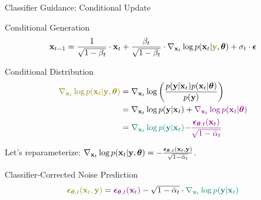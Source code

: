\documentclass{beamer}
\begin{document}
\begin{frame}{Classifier Guidance: Conditional Update}
	\begin{block}{Conditional Generation}
		\vspace{-0.5cm}
		\[
			\bx_{t - 1} = \frac{1}{\sqrt{1 - \beta_t}}\cdot \bx_t +  \frac{\beta_t}{\sqrt{1 - \beta_t}}  \cdot  \nabla_{\bx_t} \log p(\bx_t | {\color{olive}\by}, \btheta) +  \sigma_t \cdot \bepsilon
		\]
		\vspace{-0.5cm}
	\end{block}
	\begin{block}{Conditional Distribution}
		\vspace{-0.7cm}
		\begin{align*}
			{\color{olive}\nabla_{\bx_t} \log p(\bx_t | \by, \btheta)} &= \nabla_{\bx_t} \log \left(\frac{p(\by | \bx_t)p(\bx_t | \btheta)}{p(\by)} \right)\\
			&= \nabla_{\bx_t} \log p(\by | \bx_t) + {\color{violet}\nabla_{\bx_t} \log p(\bx_t | \btheta)}\\
			&= {\color{teal}\nabla_{\bx_t} \log p(\by | \bx_t)} {\color{violet}- \frac{\bepsilon_{\btheta, t}(\bx_t)}{\sqrt{1 - \bar{\alpha}_t}}}
		\end{align*}
		\vspace{-0.5cm}
	\end{block}
	Let's reparameterize: $\nabla_{\mathbf{x}_t} \log p(\mathbf{x}_t | \mathbf{y}, \boldsymbol{\theta}) = - \frac{\boldsymbol{\epsilon}_{\boldsymbol{\theta}, t}(\mathbf{x}_t, \mathbf{y})}{\sqrt{1 - \bar{\alpha}_t}}$.
	\begin{block}{Classifier-Corrected Noise Prediction}
		\vspace{-0.3cm}
		\[
			{\color{olive}\bepsilon_{\btheta, t}(\bx_t, \by)} = {\color{violet}\bepsilon_{\btheta, t}(\bx_t)} - \sqrt{1 - \bar{\alpha}_t} \cdot {\color{teal}\nabla_{\bx_t} \log p(\by | \bx_t)}
		\]
	\end{block}
\end{frame}
\end{document}
